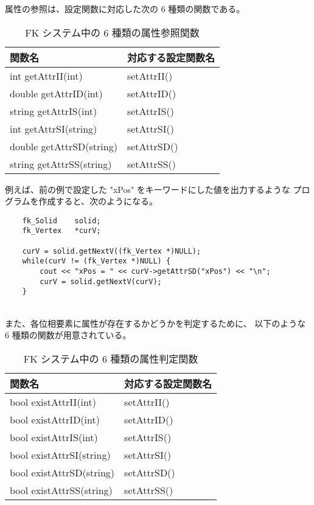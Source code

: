 属性の参照は、設定関数に対応した次の 6 種類の関数である。

\begin{table}[H]
\caption{FK システム中の 6 種類の属性参照関数}
\label{tbl:attr2}
\begin{center}
\begin{tabular}{|l|l|}
\hline
関数名 & 対応する設定関数名 \\ \hline
int getAttrII(int)		& setAttrII()	\\ \hline
double getAttrID(int)		& setAttrID()	\\ \hline
string getAttrIS(int)		& setAttrIS()	\\ \hline
int getAttrSI(string)		& setAttrSI()	\\ \hline
double getAttrSD(string)	& setAttrSD()	\\ \hline
string getAttrSS(string)	& setAttrSS()	\\ \hline
\end{tabular}
\end{center}
\end{table}

例えば、前の例で設定した "xPos" をキーワードにした値を出力するような
プログラムを作成すると、次のようになる。
\\
\begin{breakbox}
\begin{verbatim}
    fk_Solid    solid;
    fk_Vertex   *curV;

    curV = solid.getNextV((fk_Vertex *)NULL);
    while(curV != (fk_Vertex *)NULL) {
        cout << "xPos = " << curV->getAttrSD("xPos") << "\n";
        curV = solid.getNextV(curV);
    }
\end{verbatim}
\end{breakbox}
~ \\
また、各位相要素に属性が存在するかどうかを判定するために、
以下のような 6 種類の関数が用意されている。

\begin{table}[H]
\caption{FK システム中の 6 種類の属性判定関数}
\label{tbl:attr3}
\begin{center}
\begin{tabular}{|l|l|}
\hline
関数名 & 対応する設定関数名 \\ \hline
bool existAttrII(int)		& setAttrII()	\\ \hline
bool existAttrID(int)		& setAttrID()	\\ \hline
bool existAttrIS(int)		& setAttrIS()	\\ \hline
bool existAttrSI(string)	& setAttrSI()	\\ \hline
bool existAttrSD(string)	& setAttrSD()	\\ \hline
bool existAttrSS(string)	& setAttrSS()	\\ \hline
\end{tabular}
\end{center}
\end{table}

